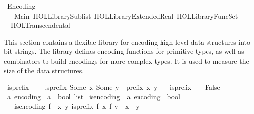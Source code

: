 %
\begin{isabellebody}%
%
%
\isadelimdocument
%
\endisadelimdocument
%
\isatagdocument
%
\isamarkuptrue%
%
\endisatagdocument
{\isafolddocument}%
%
\isadelimdocument
%
\endisadelimdocument
%
\isadelimtheory
%
\endisadelimtheory
%
\isatagtheory
{}\isamarkupfalse%
\ Encoding\isanewline
\ \ \ Main\ {\isachardoublequoteopen}HOL{\isacharminus}{\kern0pt}Library{\isachardot}{\kern0pt}Sublist{\isachardoublequoteclose}\ {\isachardoublequoteopen}HOL{\isacharminus}{\kern0pt}Library{\isachardot}{\kern0pt}Extended{\isacharunderscore}{\kern0pt}Real{\isachardoublequoteclose}\ {\isachardoublequoteopen}HOL{\isacharminus}{\kern0pt}Library{\isachardot}{\kern0pt}FuncSet{\isachardoublequoteclose}\ \isanewline
\ \ HOL{\isachardot}{\kern0pt}Transcendental\isanewline
{}%
\endisatagtheory
{\isafoldtheory}%
%
\isadelimtheory
%
\endisadelimtheory
%
\begin{isamarkuptext}%
This section contains a flexible library for encoding high level data structures into bit
strings. The library defines encoding functions for primitive types, as well as combinators
to build encodings for more complex types. It is used to measure the size of the data structures.%
\end{isamarkuptext}\isamarkuptrue%
\isamarkupfalse%
\ is{\isacharunderscore}{\kern0pt}prefix\ \ \isanewline
\ \ {\isachardoublequoteopen}is{\isacharunderscore}{\kern0pt}prefix\ {\isacharparenleft}{\kern0pt}Some\ x{\isacharparenright}{\kern0pt}\ {\isacharparenleft}{\kern0pt}Some\ y{\isacharparenright}{\kern0pt}\ {\isacharequal}{\kern0pt}\ prefix\ x\ y{\isachardoublequoteclose}\ {\isacharbar}{\kern0pt}\isanewline
\ \ {\isachardoublequoteopen}is{\isacharunderscore}{\kern0pt}prefix\ {\isacharunderscore}{\kern0pt}\ {\isacharunderscore}{\kern0pt}\ {\isacharequal}{\kern0pt}\ False{\isachardoublequoteclose}\isanewline
\isanewline
{}\isamarkupfalse%
\ {\isacharprime}{\kern0pt}a\ encoding\ {\isacharequal}{\kern0pt}\ {\isachardoublequoteopen}{\isacharprime}{\kern0pt}a\ {\isasymrightharpoonup}\ bool\ list{\isachardoublequoteclose}\isanewline
\isanewline
{}\isamarkupfalse%
\ is{\isacharunderscore}{\kern0pt}encoding\ {\isacharcolon}{\kern0pt}{\isacharcolon}{\kern0pt}\ {\isachardoublequoteopen}{\isacharprime}{\kern0pt}a\ encoding\ {\isasymRightarrow}\ bool{\isachardoublequoteclose}\isanewline
\ \ \ {\isachardoublequoteopen}is{\isacharunderscore}{\kern0pt}encoding\ f\ {\isacharequal}{\kern0pt}\ {\isacharparenleft}{\kern0pt}{\isasymforall}x\ y{\isachardot}{\kern0pt}\ is{\isacharunderscore}{\kern0pt}prefix\ {\isacharparenleft}{\kern0pt}f\ x{\isacharparenright}{\kern0pt}\ {\isacharparenleft}{\kern0pt}f\ y{\isacharparenright}{\kern0pt}\ {\isasymlongrightarrow}\ x\ {\isacharequal}{\kern0pt}\ y{\isacharparenright}{\kern0pt}{\isachardoublequoteclose}\isanewline

\end{isabellebody}
